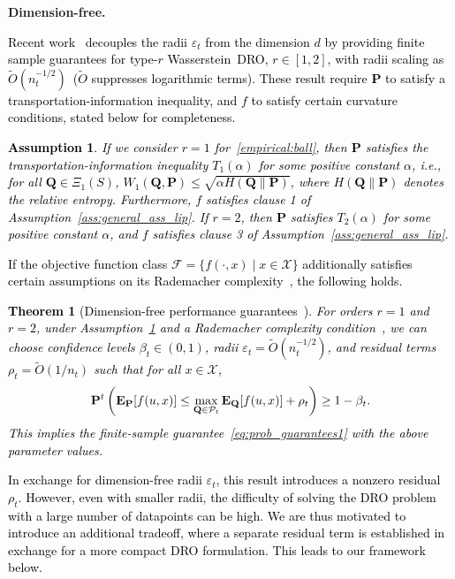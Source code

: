\documentclass[12pt]{article}
\renewcommand{\paragraph}[1]{\textbf{#1.}\;}
\newcommand{\ie}{{\it i.e.}}
\newcommand{\prob}{{\mathbf P}}
\newcommand{\Expect}{{\mbox{\bf E}}}
\newcommand{\supp}{S}
\newcommand{\unc}{u}
\newcommand{\epsnom}{\varepsilon}
\newtheorem{assumption}{Assumption}[section]
\newtheorem{theorem}{Theorem}[section]  %
\newcommand{\RC}[1]{\textcolor{black}{#1}}
\newcommand{\RC}[1]{\textcolor{blue}{#1}}
\begin{document}
\paragraph{Dimension-free} 
\RC{Recent work~\cite{gao2016distributionally} decouples the radii $\epsnom_t$ from the dimension $d$ by providing finite sample guarantees for type-$r$ Wasserstein~\gls{DRO}, $r \in [1,2]$, with radii scaling as $\tilde{O}(n_t^{-1/2})$~($\tilde{O}$ suppresses logarithmic terms). %
These result require $\prob$ to satisfy a transportation-information inequality, and $f$ to satisfy certain curvature conditions, stated below for completeness.
\begin{assumption}
\label{ass:gao}
    If we consider $r= 1$ for~\eqref{empirical:ball}, then $\prob$ satisfies the transportation-information inequality $T_1(\alpha)$ for some positive constant $\alpha$, \ie, for all $\mathbf{Q}\in \Xi_1(\supp)$, $W_1(\mathbf{Q},\prob) \leq \sqrt{\alpha H(\mathbf{Q}\|\prob)}$, where $H(\mathbf{Q}\|\prob)$ denotes the relative entropy. Furthermore, $f$ satisfies clause 1 of Assumption~\ref{ass:general_ass_lip}. If $r=2$, then $\prob$ satisfies $T_2(\alpha)$ for some positive constant $\alpha$, and $f$ satisfies clause 3 of Assumption~\ref{ass:general_ass_lip}.
\end{assumption} If the objective function class $\mathcal{F}=\{f(\cdot,x)\mid x\in\mathcal{X}\}$ additionally satisfies certain assumptions on its Rademacher complexity~\cite[Assumption 5]{gao2016distributionally}, the following holds.}
\RC{\begin{theorem}[Dimension-free performance guarantees~\cite{gao2016distributionally}]
\label{thm:informal_curse} 
For orders $r =1$ and $r=2$, under Assumption~\ref{ass:gao} and a Rademacher complexity condition~\cite[Assumption 5]{gao2016distributionally}, we can choose confidence levels $\beta_t \in (0,1)$, radii $\epsnom_t=\tilde{O}(n_t^{-1/2})$, and residual terms $\rho_{t} = \tilde{O}(1/n_t)$ such that for all $x \in \mathcal{X}$, 
\begin{equation}
	\label{eq:informal_x}
	\prob^{t}\left(\Expect_{\prob}[f(u, x)] \le  \max_{\mathbf{Q} \in \mathcal{P}_{t}}\mathbf{E}_{ \mathbf{Q}}[f(\unc,x)]+ \rho_{t}\right) \ge 1 - \beta_{t}.
\end{equation}
This implies the finite-sample guarantee~\eqref{eq:prob_guarantees1} with the above parameter values.
\end{theorem}}
\RC{In exchange for dimension-free radii $\epsnom_t$, this result introduces a nonzero residual~$\rho_t$. However, even with smaller radii, the difficulty of solving the DRO problem with a large number of datapoints can be high. We are thus motivated to introduce an additional tradeoff, where a separate residual term is established in exchange for a more compact \gls{DRO} formulation. This leads to our framework below. }
\end{document}
